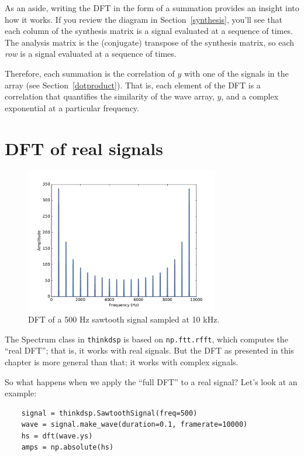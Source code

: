 \documentclass[12pt]{book}
\begin{document}
As an aside, writing the DFT in the form of a summation provides an
insight into how it works.  If you review the diagram in
Section~\ref{synthesis}, you'll see that each column of the synthesis matrix
is a signal evaluated at a sequence of times.  The analysis matrix is
the (conjugate) transpose of the synthesis matrix, so each {\em row}
is a signal evaluated at a sequence of times.

Therefore, each summation is the correlation of $y$ with one of the
signals in the array (see Section~\ref{dotproduct}).  That is, each
element of the DFT is a correlation that quantifies the similarity of
the wave array, $y$, and a complex exponential at a particular
frequency.


\section{DFT of real signals}

\begin{figure}
\centerline{\includegraphics[height=2.5in]{figs/dft3.pdf}}
\caption{DFT of a 500 Hz sawtooth signal sampled at 10 kHz.}
\label{fig.dft3}
\end{figure}

The Spectrum class in {\tt thinkdsp} is based on {\tt np.ftt.rfft},
which computes the ``real DFT''; that is, it works with real signals.
But the DFT as presented in this chapter is more general than that; it
works with complex signals.

So what happens when we apply the ``full DFT'' to a real signal?
Let's look at an example:

\begin{verbatim}
    signal = thinkdsp.SawtoothSignal(freq=500)
    wave = signal.make_wave(duration=0.1, framerate=10000)
    hs = dft(wave.ys)
    amps = np.absolute(hs)
\end{verbatim}
\end{document}

